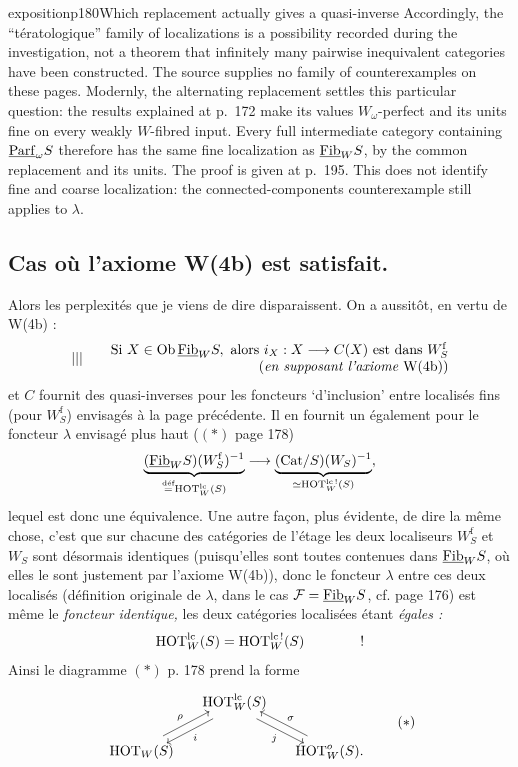 \begin{dcomment}{exposition}{p180}{Which replacement actually gives a quasi-inverse}
Accordingly, the ``t\'eratologique'' family of localizations is a possibility recorded during the investigation, not a theorem that infinitely many pairwise inequivalent categories have been constructed. The source supplies no family of counterexamples on these pages. Modernly, the alternating replacement settles this particular question: the results explained at p.~172 make its values $W_\omega$-perfect and its units fine on every weakly $W$-fibred input. Every full intermediate category containing $\underline{\mathrm{Parf}}_\omega S$ therefore has the same fine localization as $\underline{\mathrm{Fib}}_W S$, by the common replacement and its units. The proof is given at p.~195. This does not identify fine and coarse localization: the connected-components counterexample still applies to $\lambda$.
\end{dcomment}


\subsection*{ Cas où l’axiome \textmd{W(4b)} est satisfait.}

Alors les perplexités que je viens de dire disparaissent. On a aussitôt, en vertu de W(4b) :
\[
|||\qquad
\begin{array}{@{}r@{}}
\text{Si } X \in \Ob\,\Fib_W S, \text{ alors } i_X : X \longrightarrow C(X) \text{ est dans } W^{\mathrm{f}}_S \\
(\textit{en supposant l’axiome } \text{W(4b)})
\end{array}
\]
et $C$ fournit des quasi-inverses pour les foncteurs ‘d’inclusion’ entre localisés fins (pour $W^{\mathrm{f}}_S$) envisagés à la page précédente. Il en fournit un également pour le foncteur $\lambda$ envisagé plus haut ($(\ast)$ page 178)
\[
\underbrace{(\underline{\mathrm{Fib}}_W S)(W^{\mathrm{f}}_S)^{-1}}_{\overset{\text{déf}}{=}\mathrm{HOT}^{\mathrm{lc}}_W(S)} \longrightarrow \underbrace{(\mathrm{Cat}/S)(W_S)^{-1}}_{\simeq \mathrm{HOT}^{\mathrm{lc}\,!}_W(S)},
\]
lequel est donc une équivalence. Une autre façon, plus évidente, de dire la même chose, c’est que sur chacune des catégories de l’étage les deux localiseurs $W^{\mathrm{f}}_S$ et $W_S$ sont désormais identiques (puisqu’elles sont toutes contenues dans $\underline{\mathrm{Fib}}_W S$, où elles le sont justement par l’axiome W(4b)), donc le foncteur $\lambda$ entre ces deux localisés (définition originale de $\lambda$, dans le cas $\mathcal{F} = \underline{\mathrm{Fib}}_W S$, cf. page 176) est même le \textit{foncteur identique,} les deux catégories localisées étant \textit{égales :}
\[
\mathrm{HOT}^{\mathrm{lc}}_W(S) = \mathrm{HOT}^{\mathrm{lc}\,!}_W(S) \qquad\qquad !
\]
Ainsi le diagramme $(\ast)$ p. 178 prend la forme
\[
\begin{tikzcd}[column sep=small]
 & \HOT^{\mathrm{lc}}_W(S) \arrow[dl, shift left=1.2, "i"] \arrow[dr, shift right=1.2, "j"'] & \\
\HOT_W(S) \arrow[ur, shift left=1.2, "\rho"] & & \HOT^{o}_W(S). \arrow[ul, shift right=1.2, "\sigma"']
\end{tikzcd}
\tag*{$(\ast)$}
\]

